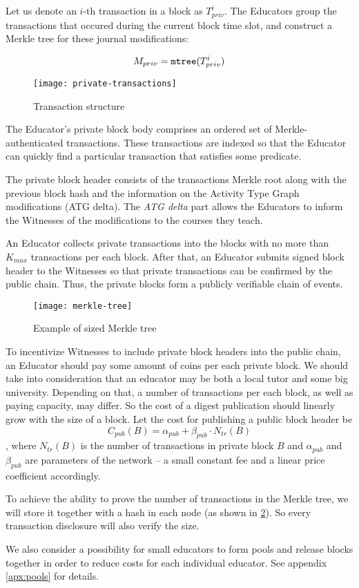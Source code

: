 Let us denote an $i$-th transaction in a block as $T_{priv}^i$. The Educators
group the transactions that occured during the current block time slot, and
construct a Merkle tree \cite{merkle1989certified} for these journal
modifications:

\begin{equation}
M_{priv} = \mathtt{mtree}(T_{priv}^i)
\end{equation}

\begin{figure}[ht]
\centering
\texttt{[image: private-transactions]}
\caption{Transaction structure}
\label{fig:private-transactions}
\end{figure}

The Educator's private block body comprises an ordered set of
Merkle-authenticated transactions. These transactions are indexed so that the
Educator can quickly find a particular transaction that satisfies some
predicate.

The private block header consists of the transactions Merkle root along with the
previous block hash and the information on the Activity Type Graph modifications
(ATG delta). The \textit{ATG delta} part allows the Educators to inform the
Witnesses of the modifications to the courses they teach.

An Educator collects private transactions into the blocks with no more than $K_{max}$
transactions per each block. After that, an Educator submits signed block header
to the Witnesses so that private transactions can be confirmed by the public
chain. Thus, the private blocks form a publicly verifiable chain of events.

\begin{figure}[ht]
\centering
\texttt{[image: merkle-tree]}
\caption{Example of sized Merkle tree}
\label{fig:merkle-tree}
\end{figure}

To incentivize Witnesses to include private block headers into the public chain,
an Educator should pay some amount of coins per each private block. We should
take into consideration that an educator may be both a local tutor and some big
university. Depending on that, a number of transactions per each block, as well
as paying capacity, may differ. So the cost of a digest publication should
linearly grow with the size of a block. Let the cost for publishing a
public block header be
\begin{equation}\label{sec:priv-chain:pub-cost-eq}
  C_{pub}(B) = \alpha_{pub} + \beta_{pub} \cdot N_{tr}(B)
\end{equation}
, where $N_{tr}(B)$ is the number of transactions in private block $B$ and
$\alpha_{pub}$ and $\beta_{pub}$ are parameters of the network -- a small
constant fee and a linear price coefficient accordingly.

To achieve the ability to prove the number of transactions in the Merkle tree,
we will store it together with a hash in each node (as shown in
\ref{fig:merkle-tree}). So every transaction disclosure will also verify the size.

We also consider a possibility for small educators to form pools and release
blocks together in order to reduce costs for each individual educator. See
appendix \ref{apx:pools} for details.
